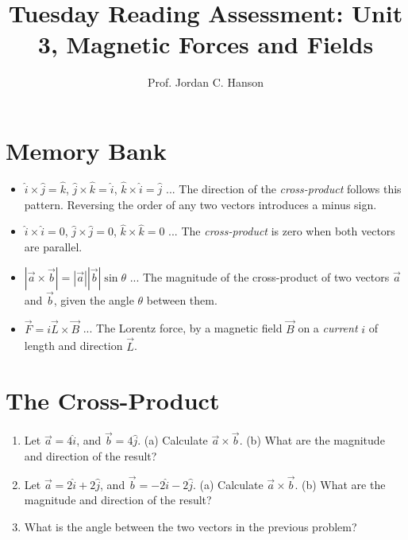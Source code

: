 \documentclass{article}
\begin{document}
\title{Tuesday Reading Assessment: Unit 3, Magnetic Forces and Fields}
\author{Prof. Jordan C. Hanson}

\maketitle

\section{Memory Bank}

\begin{itemize}
\item $\hat{i} \times \hat{j} = \hat{k}$, $\hat{j} \times \hat{k} = \hat{i}$, $\hat{k} \times \hat{i} = \hat{j}$ ... The direction of the \textit{cross-product} follows this pattern.  Reversing the order of any two vectors introduces a minus sign.
\item $\hat{i} \times \hat{i} = 0$, $\hat{j} \times \hat{j} = 0$, $\hat{k} \times \hat{k} = 0$ ... The \textit{cross-product} is zero when both vectors are parallel.
\item $|\vec{a} \times \vec{b}| = |\vec{a}||\vec{b}|\sin\theta$ ... The magnitude of the cross-product of two vectors $\vec{a}$ and $\vec{b}$, given the angle $\theta$ between them.
\item $\vec{F} = i\vec{L} \times \vec{B}$ ... The Lorentz force, by a magnetic field $\vec{B}$ on a \textit{current} $i$ of length and direction $\vec{L}$.
\end{itemize}

\section{The Cross-Product}

\begin{enumerate}
\item Let $\vec{a} = 4\hat{i}$, and $\vec{b} = 4\hat{j}$.  (a) Calculate $\vec{a} \times \vec{b}$. (b) What are the magnitude and direction of the result? \\ \vspace{0.5cm}
\item Let $\vec{a} = 2\hat{i} + 2\hat{j}$, and $\vec{b} = -2\hat{i} - 2\hat{j}$.  (a) Calculate $\vec{a} \times \vec{b}$. (b) What are the magnitude and direction of the result? \\ \vspace{0.5cm}
\item What is the angle between the two vectors in the previous problem?
\end{enumerate}
\end{document}
